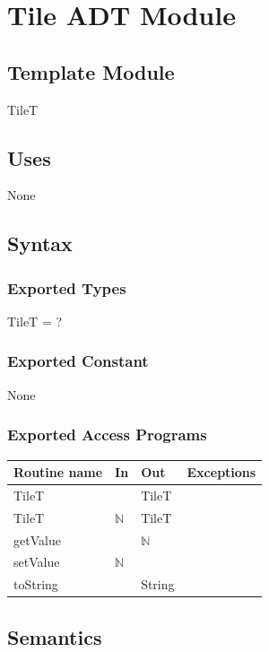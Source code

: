 \documentclass[12pt]{article}
\begin{document}
\newpage

\section* {Tile ADT Module}

\subsection*{Template Module}

TileT

\subsection* {Uses}

None

\subsection* {Syntax}

\subsubsection* {Exported Types}

TileT = ?

\subsubsection* {Exported Constant}

None

\subsubsection* {Exported Access Programs}

\begin{tabular}{| l | l | l | l |}
\hline
\textbf{Routine name} & \textbf{In} & \textbf{Out} & \textbf{Exceptions}\\
\hline
TileT & ~ & TileT & \\
\hline
TileT & $\mathbb{N}$ & TileT & \\
\hline
getValue & ~ & $\mathbb{N}$ & \\
\hline
setValue & $\mathbb{N}$ & ~ & \\
\hline
toString & ~ & String & \\
\hline
\end{tabular}

\subsection* {Semantics}
\end{document}
